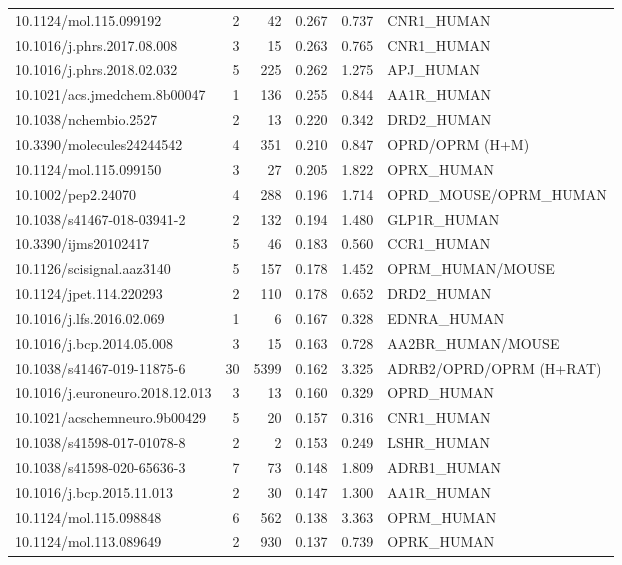 \documentclass[11pt]{article}
\begin{document}
\begin{longtable}{p{5.9cm} r r c c p{4.1cm}}
10.1124/mol.115.099192 & 2 & 42 & 0.267 & 0.737 & CNR1\_\allowbreak{}HUMAN \\
10.1016/j.phrs.2017.08.008 & 3 & 15 & 0.263 & 0.765 & CNR1\_\allowbreak{}HUMAN \\
10.1016/j.phrs.2018.02.032 & 5 & 225 & 0.262 & 1.275 & APJ\_\allowbreak{}HUMAN \\
10.1021/acs.jmedchem.8b00047 & 1 & 136 & 0.255 & 0.844 & AA1R\_\allowbreak{}HUMAN \\
10.1038/nchembio.2527 & 2 & 13 & 0.220 & 0.342 & DRD2\_\allowbreak{}HUMAN \\
10.3390/molecules24244542 & 4 & 351 & 0.210 & 0.847 & OPRD/OPRM (H+M) \\
10.1124/mol.115.099150 & 3 & 27 & 0.205 & 1.822 & OPRX\_\allowbreak{}HUMAN \\
10.1002/pep2.24070 & 4 & 288 & 0.196 & 1.714 & OPRD\_\allowbreak{}MOUSE/OPRM\_\allowbreak{}HUMAN \\
10.1038/s41467-018-03941-2 & 2 & 132 & 0.194 & 1.480 & GLP1R\_\allowbreak{}HUMAN \\
10.3390/ijms20102417 & 5 & 46 & 0.183 & 0.560 & CCR1\_\allowbreak{}HUMAN \\
10.1126/scisignal.aaz3140 & 5 & 157 & 0.178 & 1.452 & OPRM\_\allowbreak{}HUMAN/MOUSE \\
10.1124/jpet.114.220293 & 2 & 110 & 0.178 & 0.652 & DRD2\_\allowbreak{}HUMAN \\
10.1016/j.lfs.2016.02.069 & 1 & 6 & 0.167 & 0.328 & EDNRA\_\allowbreak{}HUMAN \\
10.1016/j.bcp.2014.05.008 & 3 & 15 & 0.163 & 0.728 & AA2BR\_\allowbreak{}HUMAN/MOUSE \\
10.1038/s41467-019-11875-6 & 30 & 5399 & 0.162 & 3.325 & ADRB2/OPRD/OPRM (H+RAT) \\
10.1016/j.euroneuro.2018.12.013 & 3 & 13 & 0.160 & 0.329 & OPRD\_\allowbreak{}HUMAN \\
10.1021/acschemneuro.9b00429 & 5 & 20 & 0.157 & 0.316 & CNR1\_\allowbreak{}HUMAN \\
10.1038/s41598-017-01078-8 & 2 & 2 & 0.153 & 0.249 & LSHR\_\allowbreak{}HUMAN \\
10.1038/s41598-020-65636-3 & 7 & 73 & 0.148 & 1.809 & ADRB1\_\allowbreak{}HUMAN \\
10.1016/j.bcp.2015.11.013 & 2 & 30 & 0.147 & 1.300 & AA1R\_\allowbreak{}HUMAN \\
10.1124/mol.115.098848 & 6 & 562 & 0.138 & 3.363 & OPRM\_\allowbreak{}HUMAN \\
10.1124/mol.113.089649 & 2 & 930 & 0.137 & 0.739 & OPRK\_\allowbreak{}HUMAN \\

\end{longtable}
\end{document}
